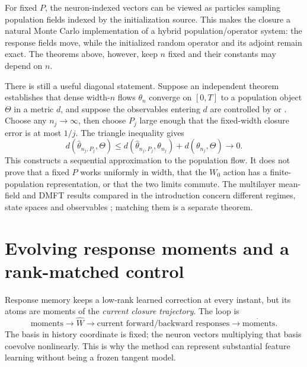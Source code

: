 \documentclass[11pt]{article}
\theoremstyle{definition}
\theoremstyle{remark}
\begin{document}
For fixed $P$, the neuron-indexed vectors can be viewed as particles sampling
population fields indexed by the initialization source.  This makes the closure
a natural Monte Carlo implementation of a hybrid population/operator system:
the response fields move, while the initialized random operator and its adjoint
remain exact.  The theorems above, however, keep $n$ fixed and their constants
may depend on $n$.

There is still a useful diagonal statement.  Suppose an independent theorem
establishes that dense width-$n$ flows $\theta_n$ converge on $[0,T]$ to a
population object $\Theta$ in a metric $d$, and suppose the observables entering
$d$ are controlled by  or .  Choose any
$n_j\to\infty$, then choose $P_j$ large enough that the fixed-width closure
error is at most $1/j$.  The triangle inequality gives
\[
 d(\widehat\theta_{n_j,P_j},\Theta)
 \le d(\widehat\theta_{n_j,P_j},\theta_{n_j})+d(\theta_{n_j},\Theta)
 \longrightarrow0.
\]
This constructs a sequential approximation to the population flow.  It does
not prove that a fixed $P$ works uniformly in width, that the $W_0$ action has a
finite-population representation, or that the two limits commute.  The
multilayer mean-field and DMFT results compared in the introduction concern
different regimes, state spaces and observables
\citep{nguyen2023rigorous,bordelon2022dmft}; matching them is a separate
theorem.

\section{Evolving response moments and a rank-matched control}

Response memory keeps a low-rank learned correction at every instant, but its
atoms are moments of the \emph{current closure trajectory}.  The loop is
\[
 \text{moments}\longrightarrow\widehat W
 \longrightarrow\text{current forward/backward responses}
 \longrightarrow\dot{\text{moments}}.
\]
The basis in history coordinate is fixed; the neuron vectors multiplying that
basis coevolve nonlinearly.  This is why the method can represent substantial
feature learning without being a frozen tangent model.
\end{document}

